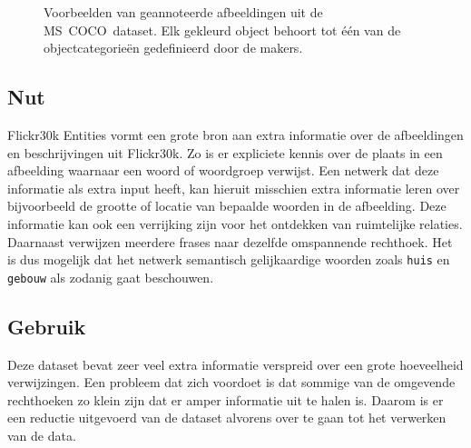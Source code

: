 \begin{figure}
    \centering
    \hfill
    \caption{Voorbeelden van geannoteerde afbeeldingen uit de \mbox{MS COCO dataset}. Elk gekleurd object behoort tot \'e\'en van de objectcategorie\"en gedefinieerd door de makers.}
    \label{fig:cocoexamples}
\end{figure}

\subsection{Nut}
Flickr30k Entities vormt een grote bron aan extra informatie over de afbeeldingen en beschrijvingen uit Flickr30k. Zo is er expliciete kennis over de plaats in een afbeelding waarnaar een woord of woordgroep verwijst. Een netwerk dat deze informatie als extra input heeft, kan hieruit misschien extra informatie leren over bijvoorbeeld de grootte of locatie van bepaalde woorden in de afbeelding. Deze informatie kan ook een verrijking zijn voor het ontdekken van ruimtelijke relaties. Daarnaast verwijzen meerdere frases naar dezelfde omspannende rechthoek. Het is dus mogelijk dat het netwerk semantisch gelijkaardige woorden zoals \texttt{huis} en \texttt{gebouw} als zodanig gaat beschouwen.


\subsection{Gebruik}
\label{sub:Gebruik}
Deze dataset bevat zeer veel extra informatie verspreid over een grote hoeveelheid verwijzingen. Een probleem dat zich voordoet is dat sommige van de omgevende rechthoeken zo klein zijn dat er amper informatie uit te halen is. Daarom is er een reductie uitgevoerd van de dataset alvorens over te gaan tot het verwerken van de data. 

